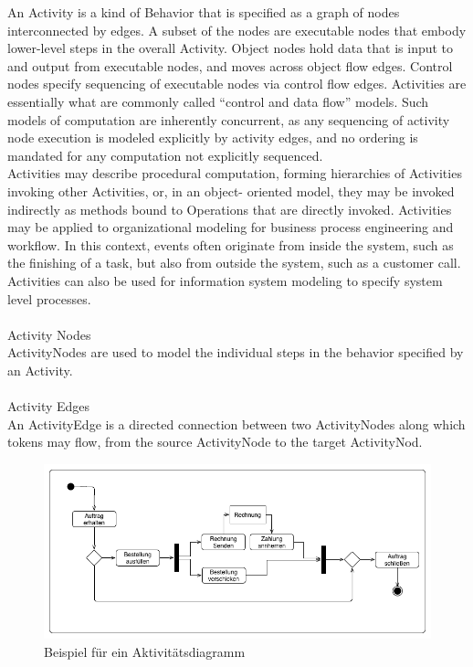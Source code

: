 \glqq An Activity is a kind of Behavior that is specified as a graph of nodes interconnected by edges. A subset of the nodes are executable nodes that embody lower-level steps in the overall Activity. Object nodes hold data that is input to and output from executable nodes, and moves across object flow edges. Control nodes specify sequencing of executable nodes via control flow edges. Activities are essentially what are commonly called “control and data flow” models. Such models of computation are inherently concurrent, as any sequencing of activity node execution is modeled explicitly by activity edges, and no ordering is mandated for any computation not explicitly sequenced.\\
Activities may describe procedural computation, forming hierarchies of Activities invoking other Activities, or, in an object- oriented model, they may be invoked indirectly as methods bound to Operations that are directly invoked. Activities may be applied to organizational modeling for business process engineering and workflow. In this context, events often originate from inside the system, such as the finishing of a task, but also from outside the system, such as a customer call. Activities can also be used for information system modeling to specify system level processes.\\
\\
Activity Nodes\\
ActivityNodes are used to model the individual steps in the behavior specified by an Activity.\\
\\
Activity Edges\\
An ActivityEdge is a directed connection between two ActivityNodes along which tokens may flow, from the source ActivityNode to the target ActivityNod.\grqq \cite{uml_def} \\

\begin{figure}[hbt!]
 \centering
  \includegraphics[width=1\textwidth]{graphics/stateoftheart/Activity_bsp}
  \caption{Beispiel für ein Aktivitätsdiagramm \cite{activity_example}}
\end{figure}
%
